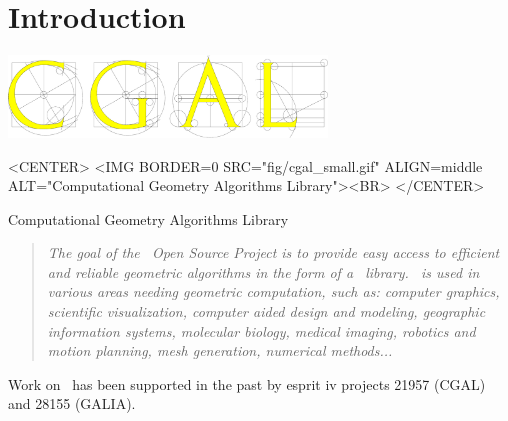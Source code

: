 
\chapter{Introduction\label{chap:intro}}

\begin{ccTexOnly}
\begin{center}
  \includegraphics[width=240pt]{Developers_manual/fig/cgal}
\end{center}
\end{ccTexOnly}

\begin{ccHtmlOnly}
<CENTER>
<IMG BORDER=0 SRC="fig/cgal_small.gif" 
  ALIGN=middle ALT="Computational Geometry Algorithms Library"><BR>
</CENTER>
\end{ccHtmlOnly}
\centerline{{\sc Computational Geometry Algorithms Library}}


\begin{quote}
{\em 
The goal of the \cgal\ Open Source Project is to provide easy access to efficient and reliable geometric algorithms in the form of a \CC\ library.
\cgal\ is used in various areas needing geometric computation, such
as: computer graphics, scientific visualization, computer aided design
and modeling, geographic information systems, molecular biology,
medical imaging, robotics and motion planning, mesh generation,
numerical methods...
%
}
\end{quote}

Work on \cgal\ has been supported in the past by {\sc esprit iv}
projects 21957 (CGAL) and 28155 (GALIA).


\InternalOnly{

}







